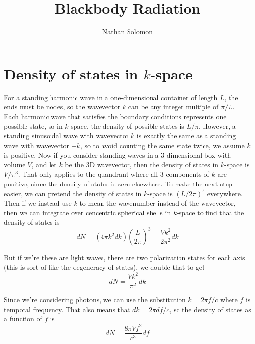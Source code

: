 \documentclass[12pt]{article}
\begin{document}
\title{Blackbody Radiation}
\author{Nathan Solomon}
\maketitle

\section{Density of states in $k$-space}
For a standing harmonic wave in a one-dimensional container of length $L$, the ends must be nodes, so the wavevector $k$ can be any integer multiple of $\pi/L$. Each harmonic wave that satisfies the boundary conditions represents one possible state, so in $k$-space, the density of possible states is $L/\pi$. However, a standing sinusoidal wave with wavevector $k$ is exactly the same as a standing wave with wavevector $-k$, so to avoid counting the same state twice, we assume $k$ is positive. Now if you consider standing waves in a 3-dimensional box with volume $V$, and let $k$ be the 3D wavevector, then the density of states in $k$-space is $V/\pi^3$. That only applies to the quandrant where all 3 components of $k$ are positive, since the density of states is zero elsewhere. To make the next step easier, we can pretend the density of states in $k$-space is $(L/2\pi)^3$ everywhere. Then if we instead use $k$ to mean the wavenumber instead of the wavevector, then we can integrate over cencentric spherical shells in $k$-space to find that the density of states is
\[ dN = (4 \pi k^2 dk) \left( \frac{L}{2 \pi} \right)^3 = \frac{V k^2}{2 \pi^2} dk \]

But if we're these are light waves, there are two polarization states for each axis (this is sort of like the degeneracy of states), we double that to get
\[ dN = \frac{V k^2}{\pi^2} dk \]

Since we're considering photons, we can use the substitution $k = 2 \pi f / c$ where $f$ is temporal frequency. That also means that $dk = 2 \pi df / c$, so the density of states as a function of $f$ is
\[ dN = \frac{8 \pi V f^2}{c^3} df \]
\end{document}
